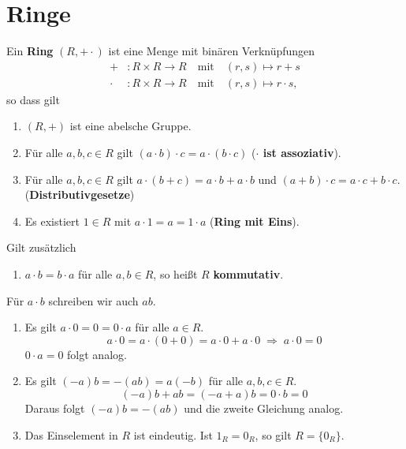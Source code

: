 \section{Ringe}
\begin{definition}
	Ein \textbf{Ring} $(R, + \cdot)$ ist eine Menge mit binären Verknüpfungen
	\begin{align*}
		+ &\colon R \times R \to R \quad\text{mit}\quad (r,s) \mapsto r+s\\
		\cdot &\colon R \times R \to R \quad\text{mit}\quad (r,s) \mapsto r\cdot s,
	\end{align*}
	so dass gilt
	\begin{enumerate}[label={\bfseries(R\arabic*)}]
		\item\label{rng1} $(R,+)$ ist eine abelsche Gruppe.
		\item\label{rng2} Für alle $a,b,c \in R$ gilt $(a \cdot b) \cdot c = a \cdot (b \cdot c)$ (\textbf{$\cdot$ ist assoziativ}).
		\item\label{rng3} Für alle $a,b,c \in R$ gilt $a\cdot (b+c) = a\cdot b + a\cdot b$ und $(a+b)\cdot c = a\cdot c + b \cdot c$. (\textbf{Distributivgesetze})
		\item\label{rng4} Es existiert $1 \in R$ mit $a \cdot 1 = a = 1 \cdot a$ (\textbf{Ring mit Eins}).
	
	\end{enumerate}
	Gilt zusätzlich
	\begin{enumerate}[label={\bfseries(R\arabic*)}, start=5]
		\item\label{rng5} $a \cdot b = b \cdot a$ für alle $a,b \in R$, so heißt $R$ \textbf{kommutativ}.
	\end{enumerate}
	
	
\end{definition}
Für $a \cdot b$ schreiben wir auch $ab$.
\begin{rem}\label{rem4_2}
	\begin{enumerate}[label=(\roman*)]
		\item Es gilt $a \cdot 0 = 0 = 0 \cdot a$ für alle $a \in R$.
		\[a \cdot 0 = a \cdot (0 + 0) = a \cdot 0 + a \cdot 0 \;\Rightarrow\; a \cdot 0 = 0\]
		$0 \cdot a = 0$ folgt analog.
		\item Es gilt $(-a)b = -(ab) = a(-b)$ für alle $a,b,c \in R$.
		\[(-a)b + ab = (-a + a) b = 0 \cdot b = 0\]
		Daraus folgt $(-a)b = -(ab)$ und die zweite Gleichung analog.
		\item Das Einselement in $R$ ist eindeutig. Ist $1_R = 0_R$, so gilt $R = \{0_R\}$.
	\end{enumerate}
\end{rem}
